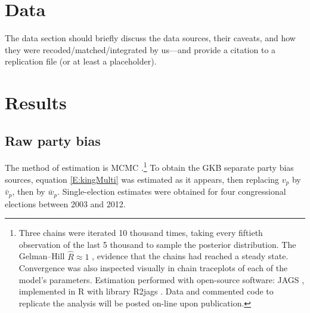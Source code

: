 \documentclass[letter,12pt]{article}
\begin{document}

\section{Data}

The data section should briefly discuss the data sources, their caveats, and how they were recoded/matched/integrated by us---and provide a citation to a replication file (or at least a placeholder). 


\section{Results}


\subsection{Raw party bias}

The method of estimation is MCMC \citep{jackman.2000}.\footnote{Three chains were iterated 10 thousand times, taking every fiftieth observation of the last 5 thousand to sample the posterior distribution. The Gelman--Hill $\hat{R} \approx 1$ \citep{gelman.hill.2007}, evidence that the chains had reached a steady state. Convergence was also inspected visually in chain traceplots of each of the model's parameters. Estimation performed with open-source software: JAGS \citep{jags.cite}, implemented in R \citep{r.cite} with library R2jags \citep{r.r2jags}. Data and commented code to replicate the analysis will be posted on-line upon publication.} To obtain the GKB separate party bias sources, equation \ref{E:kingMulti} was estimated as it appears, then replacing $v_p$ by $\bar{v}_p$, then by $\bar{w}_p$. Single-election estimates were obtained for four congressional elections between 2003 and 2012. 
\end{document}
